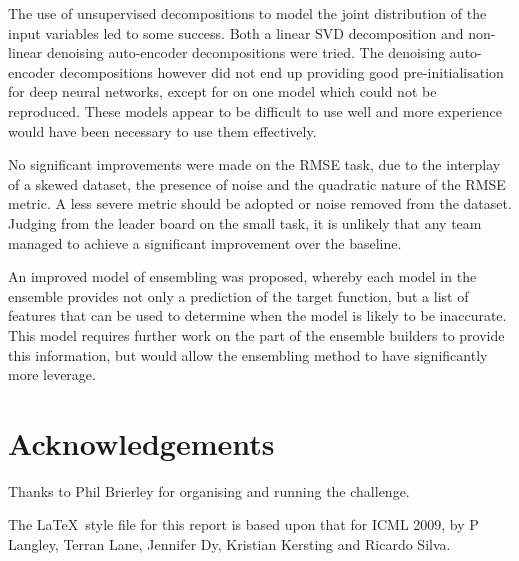 \documentclass{article}
\begin{document}
The use of unsupervised decompositions to model the joint distribution of the input variables led to some success.  Both a linear SVD decomposition and non-linear denoising auto-encoder decompositions were tried.  The denoising auto-encoder decompositions however did not end up providing good pre-initialisation for deep neural networks, except for on one model which could not be reproduced.  These models appear to be difficult to use well and more experience would have been necessary to use them effectively.

No significant improvements were made on the RMSE task, due to the interplay of a skewed dataset, the presence of noise and the quadratic nature of the RMSE metric.  A less severe metric should be adopted or noise removed from the dataset.  Judging from the leader board on the small task, it is unlikely that any team managed to achieve a significant improvement over the baseline.

An improved model of ensembling was proposed, whereby each model in the ensemble provides not only a prediction of the target function, but a list of features that can be used to determine when the model is likely to be inaccurate.  This model requires further work on the part of the ensemble builders to provide this information, but would allow the ensembling method to have significantly more leverage.

\section*{Acknowledgements} 

Thanks to Phil Brierley for organising and running the challenge.

The \LaTeX\ style file for this report is based upon that for ICML 2009, by P Langley, Terran Lane, Jennifer Dy, Kristian Kersting and Ricardo Silva.




\end{document}
